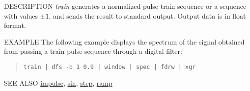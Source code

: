 \begin{synopsis}
\item[train] [ --l $L$ ] [ --p $P$ ]
\end{synopsis}

\begin{qsection}{DESCRIPTION}
{\em train} generates a normalized pulse train sequence 
or a sequence with values $\pm 1$, 
and sends the result to standard output.
Output data is in float format.
\end{qsection}

\begin{options}
\end{options}

\begin{qsection}{EXAMPLE}
The following example displays the spectrum of
the signal obtained from passing a train pulse sequence through
a digital filter:
\begin{quote}
\verb!train | dfs -b 1 0.9 | window | spec | fdrw | xgr!
\end{quote}
\end{qsection}

\begin{qsection}{SEE ALSO}
\hyperlink{impulse}{impulse},
\hyperlink{sin}{sin},
\hyperlink{step}{step},
\hyperlink{ramp}{ramp}
\end{qsection}


